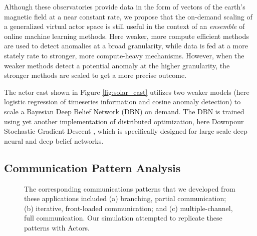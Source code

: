 \documentclass[conference,twocolumn,10pt]{IEEEtran}
\begin{document}
Although these observatories provide data in the form of vectors of the earth's magnetic field at a near constant rate, we propose that the on-demand scaling of a generalized virtual actor space is still useful in the context of an \textit{ensemble} of online machine learning methods. Here weaker, more compute efficient methods are used to detect anomalies at a broad granularity, while data is fed at a more stately rate to stronger, more compute-heavy mechanisms. However, when the weaker methods detect a potential anomaly at the higher granularity, the stronger methods are scaled to get a more precise outcome.

The actor cast shown in Figure \ref{fig:solar_cast} utilizes two weaker models (here logistic regression of timeseries information and cosine anomaly detection) to scale a Bayesian Deep Belief Network (DBN) on demand. The DBN is trained using yet another implementation of distributed optimization, here Downpour Stochastic Gradient Descent \cite{dean_large_2012}, which is specifically designed for large scale deep neural and deep belief networks.

\subsection{Communication Pattern Analysis}

\begin{figure}[!t]
    \centering
    \hfil
    \hfil
    \caption{The corresponding communications patterns that we developed from these applications included (a) branching, partial communication; (b) iterative, front-loaded communication; and (c) multiple-channel, full communication. Our simulation attempted to replicate these patterns with Actors.}
    \label{fig:communications_patterns}
\end{figure}
\end{document}
